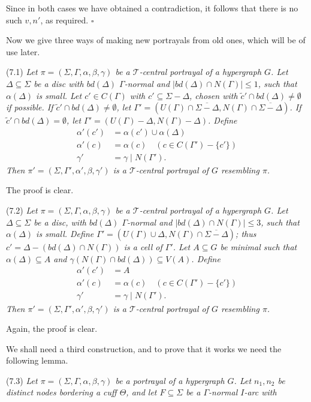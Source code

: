 Since in both cases we have obtained a contradiction, it follows that there is no such $v, n'$, as required. $\square$


Now we give three ways of making new portrayals from old ones, which will be of use later.

\stmt
(7.1) \textit{Let $\pi = (\Sigma, \Gamma, \alpha, \beta, \gamma)$ be a $\mathcal{T}$-central portrayal of a hypergraph $G$. Let $\Delta \subseteq \Sigma$ be a disc with $bd(\Delta)$ $\Gamma$-normal and $|bd(\Delta) \cap N(\Gamma)| \le 1$, such that $\alpha(\Delta)$ is small. Let $c' \in C(\Gamma)$ with $c' \subseteq \Sigma - \Delta$, chosen with $\tilde{c}' \cap bd(\Delta) \ne \emptyset$ if possible. If $\tilde{c}' \cap bd(\Delta) \ne \emptyset$, let $\Gamma' = (U(\Gamma) \cap \overline{\Sigma - \Delta}, N(\Gamma) \cap \overline{\Sigma - \Delta})$. If $\tilde{c}' \cap bd(\Delta) = \emptyset$, let $\Gamma' = (U(\Gamma) - \Delta, N(\Gamma) - \Delta)$. Define}
\begin{align*}
\alpha'(c') &= \alpha(c') \cup \alpha(\Delta) \\
\alpha'(c) &= \alpha(c) \quad (c \in C(\Gamma') - \{c'\}) \\
\gamma' &= \gamma \mid N(\Gamma').
\end{align*}
\textit{Then $\pi' = (\Sigma, \Gamma', \alpha', \beta, \gamma')$ is a $\mathcal{T}$-central portrayal of $G$ resembling $\pi$.}

The proof is clear.

\stmt
(7.2) \textit{Let $\pi = (\Sigma, \Gamma, \alpha, \beta, \gamma)$ be a $\mathcal{T}$-central portrayal of a hypergraph $G$. Let $\Delta \subseteq \Sigma$ be a disc, with $bd(\Delta)$ $\Gamma$-normal and $|bd(\Delta) \cap N(\Gamma)| \le 3$, such that $\alpha(\Delta)$ is small. Define $\Gamma' = (U(\Gamma) \cup \Delta, N(\Gamma) \cap \overline{\Sigma - \Delta})$; thus $c' = \Delta - (bd(\Delta) \cap N(\Gamma))$ is a cell of $\Gamma'$. Let $A \subseteq G$ be minimal such that $\alpha(\Delta) \subseteq A$ and $\gamma(N(\Gamma) \cap bd(\Delta)) \subseteq V(A)$. Define}
\begin{align*}
\alpha'(c') &= A \\
\alpha'(c) &= \alpha(c) \quad (c \in C(\Gamma') - \{c'\}) \\
\gamma' &= \gamma \mid N(\Gamma').
\end{align*}
\textit{Then $\pi' = (\Sigma, \Gamma', \alpha', \beta, \gamma')$ is a $\mathcal{T}$-central portrayal of $G$ resembling $\pi$.}

Again, the proof is clear.

We shall need a third construction, and to prove that it works we need the following lemma.

\stmt
(7.3) \textit{Let $\pi = (\Sigma, \Gamma, \alpha, \beta, \gamma)$ be a portrayal of a hypergraph $G$. Let $n_1, n_2$ be distinct nodes bordering a cuff $\Theta$, and let $F \subseteq \Sigma$ be a $\Gamma$-normal $I$-arc with}
